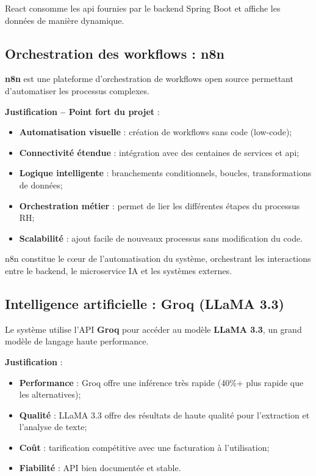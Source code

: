 React consomme les \acrfull{api} fournies par le backend Spring Boot et affiche les données de manière dynamique.


\subsection{Orchestration des workflows : n8n}
\label{subsec:orchestration-n8n}

\textbf{n8n} est une plateforme d'orchestration de workflows open source permettant d'automatiser les processus complexes.

\textbf{Justification -- Point fort du projet} :

\begin{itemize}
    \item \textbf{Automatisation visuelle} : création de workflows sans code (low-code);
    
    \item \textbf{Connectivité étendue} : intégration avec des centaines de services et \acrfull{api};
    
    \item \textbf{Logique intelligente} : branchements conditionnels, boucles, transformations de données;
    
    \item \textbf{Orchestration métier} : permet de lier les différentes étapes du processus RH;
    
    \item \textbf{Scalabilité} : ajout facile de nouveaux processus sans modification du code.
\end{itemize}

n8n constitue le cœur de l'automatisation du système, orchestrant les interactions entre le backend, le microservice IA et les systèmes externes.


\subsection{Intelligence artificielle : Groq (LLaMA 3.3)}
\label{subsec:ia-groq}

Le système utilise l'API \textbf{Groq} pour accéder au modèle \textbf{LLaMA 3.3}, un grand modèle de langage haute performance.

\textbf{Justification} :

\begin{itemize}
    \item \textbf{Performance} : Groq offre une inférence très rapide (40\%+ plus rapide que les alternatives);
    
    \item \textbf{Qualité} : LLaMA 3.3 offre des résultats de haute qualité pour l'extraction et l'analyse de texte;
    
    \item \textbf{Coût} : tarification compétitive avec une facturation à l'utilisation;
    
    \item \textbf{Fiabilité} : API bien documentée et stable.
\end{itemize}

